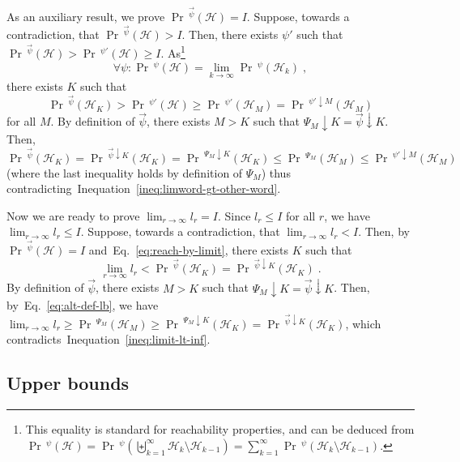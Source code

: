 \documentclass[final,3p,times,twocolumn]{elsarticle}
\theoremstyle{plain}
\theoremstyle{definition}
\newcommand{\infimum}{I}
\newcommand{\phit}{\mathcal{H}}
\newcommand{\iword}{\psi}
\DeclareMathOperator{\prWord}{Pr}
\newcommand{\lb}{l}
\newcommand{\iter}{r}
\newcommand{\recallEquation}[1]{Eq.~\ref{#1}}
\newcommand{\wprefix}[2]{\text{${#1}\!\!\downarrow\!\!{#2}$}}
\newcommand{\limword}{\vec{\iword}}
\newcommand{\recallInequation}[1]{Inequation~\ref{#1}}
\newcommand{\qsep}{:}
\newcommand{\pr}{\prWord\,\!}
\begin{document}
As an auxiliary result, we prove $\pr^{\limword}(\phit) = \infimum$.
Suppose, towards a contradiction, that $\pr^{\limword}(\phit) > \infimum$.
Then, there exists $\iword'$ such that
$\pr^{\limword}(\phit) > \pr^{\iword'}(\phit) \geq \infimum$.
As\footnote{This equality is standard for reachability properties, and can
be deduced from
$\pr^{\iword}(\phit)
= \pr^{\iword}(\biguplus_{k=1}^{\infty} \phit_{k} \setminus \phit_{k-1})
= \sum_{k=1}^{\infty} \pr^{\iword}(\phit_{k} \setminus \phit_{k-1})$.}
\begin{equation}
\label{eq:reach-by-limit}
\forall \iword \qsep \pr^{\iword}(\phit)
= \lim_{k \to \infty} \pr^{\iword}(\phit_{k}) \; ,
\end{equation}
there exists $K$ such that
\begin{equation}
\label{ineq:limword-gt-other-word}
\pr^{\limword}(\phit_{K}) > \pr^{\iword'}(\phit)
					\geq \pr^{\iword'}(\phit_{M}) =
						\pr^{\wprefix{\iword'}{M}}(\phit_{M})
\end{equation}
for all $M$.
By definition of $\limword$, there exists $M > K$ such that
$\wprefix{\Psi_{M}}{K} = \wprefix{\limword}{K}$. Then,
$\pr^{\limword}(\phit_{K})
= \pr^{\wprefix{\limword}{K}}(\phit_{K})
= \pr^{\wprefix{\Psi_{M}}{K}}(\phit_{K})
\leq \pr^{\Psi_{M}}(\phit_{M})
\leq \pr^{\wprefix{\iword'}{M}}(\phit_{M})$ (where the last inequality holds by
definition of $\Psi_{M}$) thus
contradicting~\recallInequation{ineq:limword-gt-other-word}.

Now we are ready to prove $\lim_{\iter \to \infty} \lb_{\iter} = \infimum$.
Since $\lb_{\iter} \leq \infimum$ for all $\iter$, we have
$\lim_{\iter \to \infty} \lb_{\iter} \leq \infimum$. Suppose, towards a
contradiction, that $\lim_{\iter \to \infty} \lb_{\iter} < \infimum$. Then, by
$\pr^{\limword}(\phit) = \infimum$ and~\recallEquation{eq:reach-by-limit},
there exists $K$ such that
\begin{equation}
\label{ineq:limit-lt-inf}
\lim_{\iter \to \infty} \lb_{\iter} < \pr^{\limword}(\phit_{K})
	= \pr^{\wprefix{\limword}{K}}(\phit_{K}) \; .
\end{equation}
By definition of $\limword$, there exists $M > K$ such that
$\wprefix{\Psi_{M}}{K} = \wprefix{\limword}{K}$.
Then, by~\recallEquation{eq:alt-def-lb}, we have
$\lim_{\iter \to \infty} \lb_{\iter}
\geq \pr^{\Psi_{M}}(\phit_{M})
\geq \pr^{\wprefix{\Psi_{M}}{K}}(\phit_{K})
= \pr^{\wprefix{\limword}{K}}(\phit_{K})$, which
contradicts~\recallInequation{ineq:limit-lt-inf}.

\subsection{Upper bounds}
\end{document}
